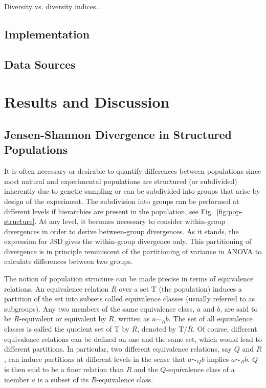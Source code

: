 \documentclass[a4paper]{article}
\newcommand{\set}{\mathrm}
\newcommand{\qset}[2]{\set{#1}/#2}
\begin{document}
Diversity vs. diversity indices...

\begin{figure}[hbt!]
  
\end{figure}

\subsection{Implementation}
\label{sec:implementation}

\subsection{Data Sources}
\label{sec:data-sources}

\section{Results and Discussion}
\label{sec:results-discussion}

\subsection{Jensen-Shannon Divergence in Structured Populations}
\label{sec:jsd-structured}

It is often necessary or desirable to quantify differences between
populations since most natural and experimental populations are
structured (or subdivided) inherently due to genetic sampling or can
be subdivided into groups that arise by design of the experiment. The
subdivision into groups can be performed at different levels if
hierarchies are present in the population, see
Fig.~\ref{fig:pop-structure}. At any level, it becomes necessary to
consider within-group divergences in order to derive between-group
divergences. As it stands, the expression for JSD gives the
within-group divergence only. This partitioning of divergence is in
principle reminiscent of the partitioning of variance in ANOVA to
calculate differences between two groups.


The notion of population structure can be made precise in terms of
equivalence relations. An equivalence relation $R$ over a set
$\set{T}$ (the population) induces a partition of the set into subsets
called equivalence classes (usually referred to as subgroups). Any two
members of the same equivalence class, $a$ and $b$, are said to be
$R$-equivalent or equivalent by $R$, written as $a \sim_R b$. The set
of all equivalence classes is called the quotient set of $\set{T}$ by
$R$, denoted by $\qset{T}{R}$. Of course, different equivalence
relations can be defined on one and the same set, which would lead to
different partitions. In particular, two different equivalence
relations, say $Q$ and $R$, can induce partitions at different levels
in the sense that $a \sim_Q b$ implies $a \sim_R b$. $Q$ is then said
to be a finer relation than $R$ and the $Q$-equivalence class of a
member $a$ is a subset of its $R$-equivalence class.
\end{document}
